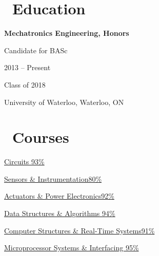 \documentclass{resume}
\begin{document}
\begin{multicols}{2}

\section{\faGraduationCap\ Education}
\textbf{Mechatronics Engineering, Honors}\par
Candidate for BASc\par
2013 -- Present\par
Class of 2018\par
University of Waterloo, Waterloo, ON

\columnbreak

\section{\faBook\ Courses}
\href{http://www.ucalendar.uwaterloo.ca/1516/COURSE/course-MTE.html#MTE120}{Circuits \hfill 93\%} \par
\href{http://www.ucalendar.uwaterloo.ca/1516/COURSE/course-MTE.html#MTE220}{Sensors \& Instrumentation\hfill 80\%}\par
\href{http://www.ucalendar.uwaterloo.ca/1516/COURSE/course-MTE.html#MTE320}{Actuators \& Power Electronics\hfill 92\%}\par

\href{http://www.ucalendar.uwaterloo.ca/1516/COURSE/course-MTE.html#MTE262}{Data Structures \& Algorithms \hfill 94\%}\par
\href{http://www.ucalendar.uwaterloo.ca/1516/COURSE/course-MTE.html#MTE241}{Computer Structures \& Real-Time Systems\hfill 91\%}\par
\href{http://www.ucalendar.uwaterloo.ca/1516/COURSE/course-MTE.html#MTE341}{Microprocessor Systems \& Interfacing \hfill 95\%}

\end{multicols}
\end{document}
